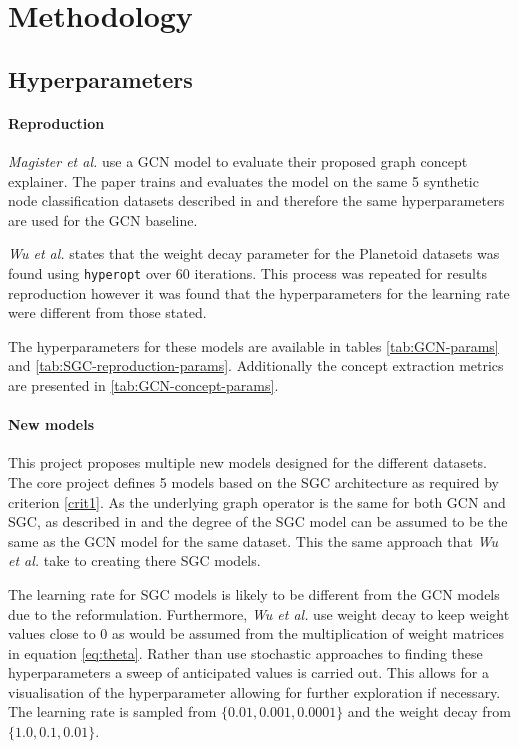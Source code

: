 \section{Methodology}

\subsection{Hyperparameters}
\label{sec:hyperparameters}

\paragraph{Reproduction}
\textit{Magister et al.}\cite{magister2021gcexplainer} use a GCN model to evaluate their proposed graph concept explainer.
The paper trains and evaluates the model on the same 5 synthetic node classification datasets described in  and therefore the same hyperparameters are used for the GCN baseline.

\textit{Wu et al.}\cite{wu2019simplifying} states that the weight decay parameter for the Planetoid\cite{kipf2016semi} datasets was found using \texttt{hyperopt} over 60 iterations.
This process was repeated for results reproduction however it was found that the hyperparameters for the learning rate were different from those stated.

The hyperparameters for these models are available in tables \ref{tab:GCN-params} and \ref{tab:SGC-reproduction-params}.
Additionally the concept extraction metrics are presented in \ref{tab:GCN-concept-params}.





\paragraph{New models}
This project proposes multiple new models designed for the different datasets.
The core project defines 5 models based on the SGC architecture as required by criterion \ref{crit1}.
As the underlying graph operator is the same for both GCN and SGC, as described in  and  the degree of the SGC model can be assumed to be the same as the GCN model for the same dataset.
This the same approach that \textit{Wu et al.}\cite{wu2019simplifying} take to creating there SGC models.

The learning rate for SGC models is likely to be different from the GCN models due to the reformulation.
Furthermore, \textit{Wu et al.}\cite{wu2019simplifying} use weight decay to keep weight values close to $0$ as would be assumed from the multiplication of weight matrices in equation \ref{eq:theta}.
Rather than use stochastic approaches to finding these hyperparameters a sweep of anticipated values is carried out.
This allows for a visualisation of the hyperparameter allowing for further exploration if necessary.
The learning rate is sampled from $\{0.01, 0.001, 0.0001\}$ and the weight decay from $\{1.0, 0.1, 0.01\}$.

